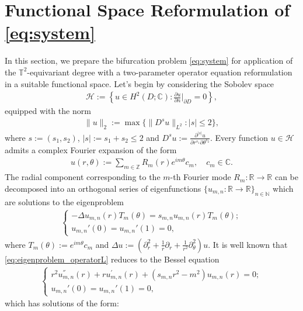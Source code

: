 \documentclass[11pt]{amsart}
\def\bc{{\mathbb{C}}}
\def\bn{{\mathbb{N}}}
\def\br{{\mathbb{R}}}
\def\bz{{\mathbb{Z}}}
\def\bt{{\mathbb{T}}}
\def\br{\mathbb R}
\begin{document}
\section{Functional Space Reformulation of \eqref{eq:system}} \label{sec:reformulation}
In this section, we prepare the bifurcation problem \eqref{eq:system} for application of the $\bt^2$-equivariant degree with a two-parameter operator equation reformulation in a suitable functional space. Let's begin by considering the Sobolev space 
\begin{align}\label{def:space_H}
\mathscr H := \left\{ u \in H^2(D; \bc): \frac{\partial u}{\partial n}|_{\partial D} = 0 \right\},
\end{align}
equipped with the norm
\begin{align} \label{def:sobolev_norm}
\|u\|_{2}:=\max\{\|D^s u\|_{L^2}: |s|\le 2\},
\end{align}
where $s := (s_1,s_2)$, $|s|:=s_1+s_2 \leq 2$ and $D^s u :=\frac{\partial ^{|s|} u}{\partial r^{s_1} \partial \theta^{s_2}}$. 
Every function $u\in\mathscr H$ admits a complex Fourier expansion of the form
\begin{align}\label{def:fourier_expansion_H}
u(r,\theta) := \sum_{m \in \bz}  R_{m}(r)e^{im\theta}c_m, \quad c_m \in \bc.
\end{align}
The radial component corresponding to the $m$-th Fourier mode $R_m: \br \rightarrow \br$ can be decomposed into an orthogonal series of eigenfunctions $\{ u_{m,n} : \br \rightarrow \br\}_{n \in \bn}$ which are solutions to the eigenproblem
\begin{align}\label{eq:eigenproblem_operatorL}
\begin{cases}
    -\Delta u_{m,n}(r)T_m(\theta) = s_{m,n} u_{m,n}(r)T_m(\theta);   \\
    u_{m,n}'(0) = u_{m,n}'(1) = 0,
\end{cases}
\end{align}
where $T_m(\theta):= e^{im\theta}c_m$ and $\Delta u := (\partial_r^2 + \frac{1}{r}\partial_r + \frac{1}{r^2}\partial_\theta^2) u$. It is well known that \eqref{eq:eigenproblem_operatorL} reduces to the Bessel equation
\begin{align*}
    \begin{cases}
        r^2u^{''}_{m,n}(r) + r u^{'}_{m,n}(r) + \left( s_{m,n}r^2 - m^2 \right)u_{m,n}(r) = 0; \\
        u_{m,n}'(0) = u_{m,n}'(1) = 0,
    \end{cases}
\end{align*}
which has solutions of the form: 
\end{document}
